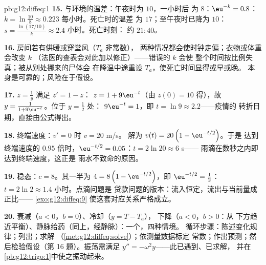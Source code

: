 \begin{solution}{pb:g12:diffeq:1}
\textbf{15.} 与环境的温差：午夜时为 $10$，一小时后
为 $8$：$\eu^{-k} = 0.8$：
$k = \ln\frac{10}{8} \approx 0.223$ 每小时。死亡时的温差
为 $17$；至午夜时已降为 $10$：
$s = \frac{\ln(17/10)}{k} \approx 2.4$ 小时。死亡时刻：
约 $21{:}40$。

\textbf{16.} 房间若有供暖或穿堂风（$T_a$ 非常数），
两种情况都会使时钟走偏；衣物或体重会改变 $k$
（法医的查表会对此加以修正）——错误的 $k$ 会使
整个时间按比例失真；被从别处挪来的尸体会
在降温中途重设 $T_a$，使死亡时间显得或早或晚。
本身是可靠的；风险在于假设。

\textbf{17.} $z = \frac1y$ 满足 $z' = 1 - z$：
$z = 1 + 9\eu^{-t}$（由 $z(0) = 10$ 得），故
$y = \frac{1}{1 + 9\eu^{-t}}$。位于 $y = \frac12$ 处：
$9\eu^{-t} = 1$，即 $t = \ln 9 \approx 2.2$——疫情的
转折日期，直接由公式得出。

\textbf{18.} 终端速度：$v' = 0$ 时 $v = 20$ m/s。
解为 $v(t) = 20\left(1 - \eu^{-t/2}\right)$。于是
达到终端速度的 $0.95$ 倍时，$\eu^{-t/2} = 0.05$：$t = 2\ln 20 \approx 6$ s——
雨滴在数秒之内即达到终端速度，这正是
雨水不致命的原因。

\textbf{19.} 稳态：$c = 8$。其一半为
$4 = 8\left(1 - \eu^{-t/2}\right)$，即 $\eu^{-t/2} = \frac12$：
$t = 2\ln 2 \approx 1.4$ 小时。点滴问题是
贷款问题的版本：流入恒定，流出与当前量成正比——
\cref{exo:g12:diffeq:9} 使这套对应关系严格成立。

\textbf{20.} 衰减（$a < 0$，$b = 0$）、冷却（$y = T - T_a$），
下降（$a < 0$，$b > 0$：从
下方趋近平衡）、静脉给药（同上，经静脉）：一个，四种情境。
循环步骤：陈述变化规律；列出；求解
（\cref{met:g12:diffeq:solve}）；依测量数据标定
常数；作出预测；然后检验假设（第
16 题）。振荡需满足 $y'' = -\omega^2 y$——此已遇到、已求解，
并在\cref{pb:g12:trigo:1}中使之振动起来。
\end{solution}
